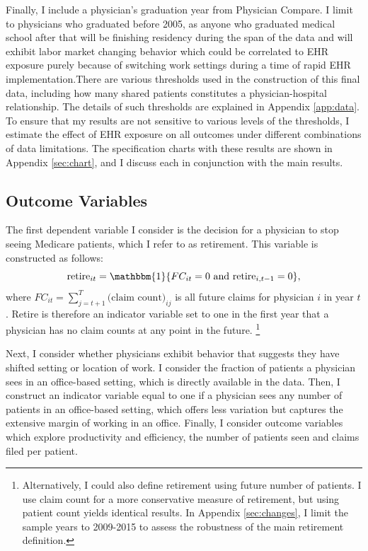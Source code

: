 \documentclass[12pt]{article}
\begin{document}
Finally, I include a physician's graduation year from Physician Compare. I limit to physicians who graduated before 2005, as anyone who graduated medical school after that will be finishing residency during the span of the data and will exhibit labor market changing behavior which could be correlated to EHR exposure purely because of switching work settings during a time of rapid EHR implementation.There are various thresholds used in the construction of this final data, including how many shared patients constitutes a physician-hospital relationship. The details of such thresholds are explained in Appendix \ref{app:data}. To ensure that my results  are not sensitive to various levels of the thresholds, I estimate the effect of EHR exposure on all outcomes under different combinations of data limitations. The specification charts with these results are shown in Appendix \ref{sec:chart}, and I discuss each in conjunction with the main results. 

\subsection{Outcome Variables}\label{sec:outcome}

The first dependent variable I consider is the decision for a physician to stop seeing Medicare patients, which I refer to as retirement. This variable is constructed as follows: 
$$\text{retire}_{it}=\mathbbm{1}\{FC_{it}=0 \text{ and retire}_{i,t-1}=0\}, $$
where $FC_{it}=\sum\limits_{j=t+1}^T\text{(claim count)}_{ij}$ is all future claims for physician $i$ in year $t$. Retire is therefore an indicator variable set to one in the first year that a physician has no claim counts at any point in the future. \footnote{Alternatively, I could also define retirement using future number of patients. I use claim count for a more conservative measure of retirement, but using patient count yields identical results. In Appendix \ref{sec:changes}, I limit the sample years to 2009-2015 to assess the robustness of the main retirement definition.}

Next, I consider whether physicians exhibit behavior that suggests they have shifted setting or location of work. I consider the fraction of patients a physician sees in an office-based setting, which is directly available in the data. Then, I construct an indicator variable equal to one if a physician sees any number of patients in an office-based setting, which offers less variation but captures the extensive margin of working in an office. Finally, I consider outcome variables which explore productivity and efficiency, the number of patients seen and claims filed per patient.
\end{document}
